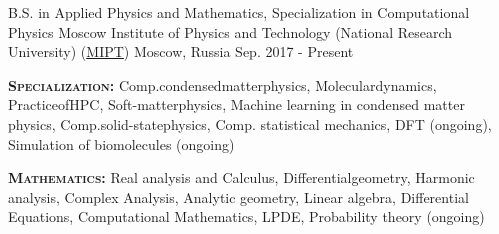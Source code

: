 

\begin{cventries}

  \cventry
    {B.S. in Applied Physics and Mathematics, Specialization in Computational Physics} %
    {Moscow Institute of Physics and Technology (National Research University) (\href{https://mipt.ru/english/}{MIPT})} %
    {Moscow, Russia} %
    {Sep. 2017 - Present} %
    {
      \begin{cvitems} %
        \item {\textsc{\textbf{Specialization:}} Comp.\hspace{2pt}condensed\hspace{2pt}matter\hspace{2pt}physics, \hspace{10pt} Molecular\hspace{2pt}dynamics, \hspace{10pt} Practice\hspace{2pt}of\hspace{2pt}HPC, \hspace{10pt} Soft-matter\hspace{2pt}physics, \hspace{10pt} \newline \textsf{Machine learning in condensed matter physics}, \hspace{10pt} \textsf{Comp.\hspace{2pt}solid-state\hspace{2pt}physics}, \hspace{10pt} \textsf{Comp. statistical mechanics}, \hspace{10pt} \textsf{DFT (ongoing)}, \hspace{10pt} \newline  \textsf{Simulation of biomolecules (ongoing)}}
        \item {\textsc{\textbf{Mathematics:}} Real analysis and Calculus, \hspace{5pt} Differential\hspace{2pt}geometry, \hspace{5pt} Harmonic analysis, \hspace{5pt} Complex Analysis, \hspace{5pt} Analytic geometry, \hspace{5pt} Linear algebra, \hspace{5pt} Differential Equations, \hspace{10pt} \textsf{Computational Mathematics}, \hspace{10pt} \textsf{LPDE}, \hspace{10pt} \textsf{Probability theory (ongoing)}}

\end{cvitems}}
\end{cventries}
